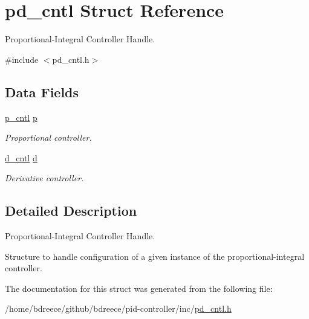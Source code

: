 \hypertarget{structpd__cntl}{}\section{pd\+\_\+cntl Struct Reference}
\label{structpd__cntl}


Proportional-\/\+Integral Controller Handle.  




{\ttfamily \#include $<$pd\+\_\+cntl.\+h$>$}

\subsection*{Data Fields}
\begin{DoxyCompactItemize}
\item 
\mbox{\label{structpd__cntl_a1280549be9fe48427116055eb5cb2d3c}} 
\hyperlink{structp__cntl}{p\+\_\+cntl} \hyperlink{structpd__cntl_a1280549be9fe48427116055eb5cb2d3c}{p}
\begin{DoxyCompactList}\small\item\em Proportional controller. \end{DoxyCompactList}\item 
\mbox{\label{structpd__cntl_aaad76ce87c0060cd16ae76d556dc77de}} 
\hyperlink{structd__cntl}{d\+\_\+cntl} \hyperlink{structpd__cntl_aaad76ce87c0060cd16ae76d556dc77de}{d}
\begin{DoxyCompactList}\small\item\em Derivative controller. \end{DoxyCompactList}\end{DoxyCompactItemize}


\subsection{Detailed Description}
Proportional-\/\+Integral Controller Handle. 

Structure to handle configuration of a given instance of the proportional-\/integral controller. 

The documentation for this struct was generated from the following file\+:\begin{DoxyCompactItemize}
\item 
/home/bdreece/github/bdreece/pid-\/controller/inc/\hyperlink{pd__cntl_8h}{pd\+\_\+cntl.\+h}\end{DoxyCompactItemize}
